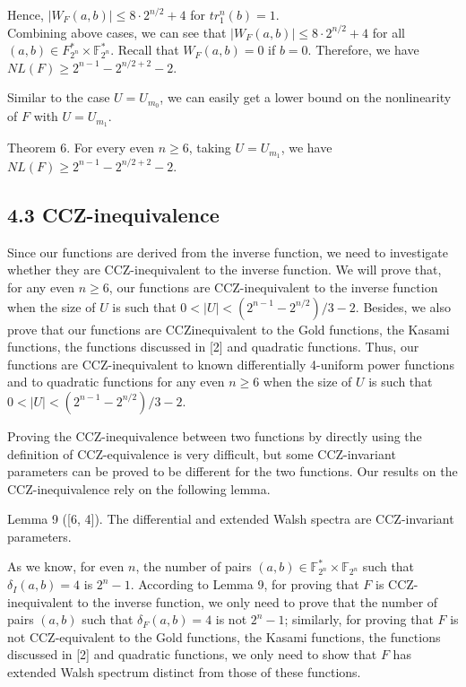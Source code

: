 \documentclass[10pt]{article}
\begin{document}
Hence, $\left|W_{F}(a, b)\right| \leq 8 \cdot 2^{n / 2}+4$ for $t r_{1}^{n}(b)=1$.\\
Combining above cases, we can see that $\left|W_{F}(a, b)\right| \leq 8 \cdot 2^{n / 2}+4$ for all $(a, b) \in F_{2^{n}}^{*} \times \mathbb{F}_{2^{n}}^{*}$. Recall that $W_{F}(a, b)=0$ if $b=0$. Therefore, we have $N L(F) \geq 2^{n-1}-2^{n / 2+2}-2$.

Similar to the case $U=U_{m_{0}}$, we can easily get a lower bound on the nonlinearity of $F$ with $U=U_{m_{1}}$.

Theorem 6. For every even $n \geq 6$, taking $U=U_{m_{1}}$, we have $N L(F) \geq 2^{n-1}-2^{n / 2+2}-2$.

\subsection*{4.3 CCZ-inequivalence}
Since our functions are derived from the inverse function, we need to investigate whether they are CCZ-inequivalent to the inverse function. We will prove that, for any even $n \geq 6$, our functions are CCZ-inequivalent to the inverse function when the size of $U$ is such that $0<|U|<\left(2^{n-1}-2^{n / 2}\right) / 3-2$. Besides, we also prove that our functions are CCZinequivalent to the Gold functions, the Kasami functions, the functions discussed in [2] and quadratic functions. Thus, our functions are CCZ-inequivalent to known differentially 4-uniform power functions and to quadratic functions for any even $n \geq 6$ when the size of $U$ is such that $0<|U|<\left(2^{n-1}-2^{n / 2}\right) / 3-2$.

Proving the CCZ-inequivalence between two functions by directly using the definition of CCZ-equivalence is very difficult, but some CCZ-invariant parameters can be proved to be different for the two functions. Our results on the CCZ-inequivalence rely on the following lemma.

Lemma 9 ([6, 4]). The differential and extended Walsh spectra are CCZ-invariant parameters.

As we know, for even $n$, the number of pairs $(a, b) \in \mathbb{F}_{2^{n}}^{*} \times \mathbb{F}_{2^{n}}$ such that $\delta_{I}(a, b)=4$ is $2^{n}-1$. According to Lemma 9, for proving that $F$ is CCZ-inequivalent to the inverse function, we only need to prove that the number of pairs $(a, b)$ such that $\delta_{F}(a, b)=4$ is not $2^{n}-1$; similarly, for proving that $F$ is not CCZ-equivalent to the Gold functions, the Kasami functions, the functions discussed in [2] and quadratic functions, we only need to show that $F$ has extended Walsh spectrum distinct from those of these functions.
\end{document}
